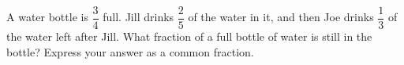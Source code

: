 A water bottle is $\dfrac{3}{4}$ full. Jill drinks $\dfrac{2}{5}$ of the water in it, and then Joe drinks $\dfrac{1}{3}$ of the water left after Jill. What fraction of a full bottle of water is still in the bottle? Express your answer as a common fraction.
